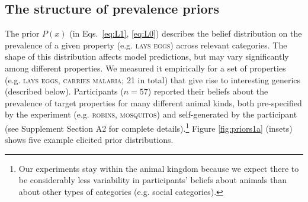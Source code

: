\documentclass{pnastwo}
\begin{document}
\begin{article}
\subsection{The structure of prevalence priors}




 The prior $P(x)$ (in Eqs.~\ref{eq:L1}, \ref{eq:L0}) describes the belief distribution on the prevalence of a given property (e.g. \textsc{lays eggs}) across relevant categories. 
The shape of this distribution affects model predictions, but may vary significantly among different properties.
 We measured it empirically for a set of properties (e.g. \textsc{lays eggs, carries malaria}; 21 in total) that give rise to interesting generics (described below). 
 Participants ($n=57$) reported their beliefs about the prevalence of target properties for many different animal kinds, both pre-specified by the experiment (e.g. \textsc{robins, mosquitos}) and self-generated by the participant (see Supplement Section A2 for complete details).\footnote{Our experiments stay within the animal kingdom because we expect there to be considerably less variability in participants' beliefs about animals than about other types of categories (e.g. social categories).} 
 Figure \ref{fig:priors1a} (insets) shows five example elicited prior distributions.



\end{article}
\end{document}

